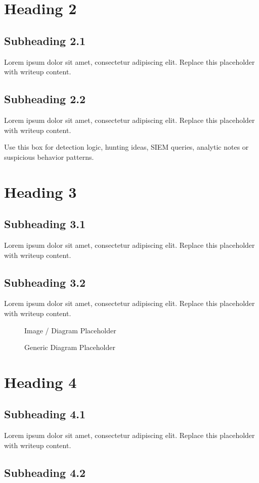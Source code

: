 \documentclass[11pt,a4paper]{article}
\let\oldsection\section
\renewcommand{\section}{\clearpage\oldsection}
\newcommand{\placeholder}{\textcolor{muted}{Lorem ipsum dolor sit amet, consectetur adipiscing elit. Replace this placeholder with writeup content.}}
\newcommand{\imageplaceholder}[1]{
\begin{figure}[H]
\centering
\begin{tcolorbox}[
    colback=codebg,
    colframe=primary,
    coltext=muted,
    width=\textwidth,
    height=0.28\textheight,
    valign=center,
    halign=center,
    arc=6pt,
    boxrule=1pt
]
Image / Diagram Placeholder
\end{tcolorbox}
\caption{#1}
\end{figure}
}
\begin{document}
\section{Heading 2}

\subsection{Subheading 2.1}

\placeholder

\subsection{Subheading 2.2}

\placeholder

\begin{detectionbox}
Use this box for detection logic, hunting ideas, SIEM queries, analytic notes or suspicious behavior patterns.
\end{detectionbox}

\section{Heading 3}

\subsection{Subheading 3.1}

\placeholder

\subsection{Subheading 3.2}

\placeholder

\imageplaceholder{Generic Diagram Placeholder}

\section{Heading 4}

\subsection{Subheading 4.1}

\placeholder

\subsection{Subheading 4.2}
\end{document}
